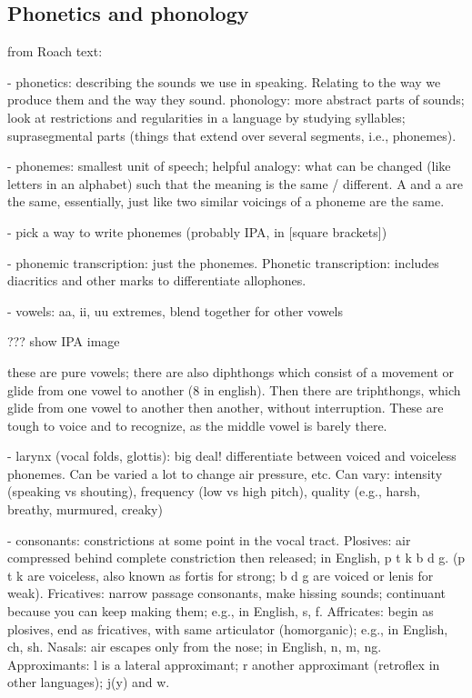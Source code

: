 \subsection{Phonetics and phonology}

from Roach text:

- phonetics: describing the sounds we use in speaking.
  Relating to the way we produce them and the way they sound.
  phonology: more abstract parts of sounds; look at restrictions
  and regularities in a language by studying syllables;
  suprasegmental parts (things that extend over several segments,
  i.e., phonemes).

- phonemes: smallest unit of speech; helpful analogy:
  what can be changed (like letters in an alphabet) such that
  the meaning is the same / different. A and a are the same,
  essentially, just like two similar voicings of a phoneme
  are the same.

  - pick a way to write phonemes (probably IPA, in [square brackets])

  - phonemic transcription: just the phonemes. Phonetic transcription:
    includes diacritics and other marks to differentiate allophones.

- vowels: aa, ii, uu extremes, blend together for other vowels

  ??? show IPA image

  these are pure vowels; there are also diphthongs which consist
  of a movement or glide from one vowel to another (8 in english).
  Then there are triphthongs, which glide from one vowel
  to another then another, without interruption.
  These are tough to voice and to recognize, as the middle
  vowel is barely there.

- larynx (vocal folds, glottis): big deal! differentiate between
  voiced and voiceless phonemes. Can be varied a lot
  to change air pressure, etc. Can vary:
  intensity (speaking vs shouting),
  frequency (low vs high pitch),
  quality (e.g., harsh, breathy, murmured, creaky)

- consonants: constrictions at some point in the vocal tract.
  Plosives: air compressed behind complete constriction then released;
  in English, p t k b d g. (p t k are voiceless, also known as fortis
  for strong; b d g are voiced or lenis for weak).
  Fricatives: narrow passage consonants, make hissing sounds;
  continuant because you can keep making them; e.g., in English, s, f.
  Affricates: begin as plosives, end as fricatives, with same articulator
  (homorganic); e.g., in English, ch, sh.
  Nasals: air escapes only from the nose; in English, n, m, ng.
  Approximants: l is a lateral approximant; r another approximant
  (retroflex in other languages); j(y) and w.

